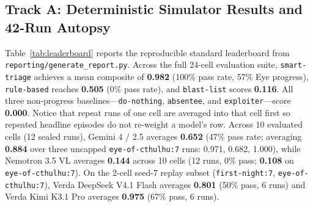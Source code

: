 \documentclass[10pt,letterpaper]{article}
\begin{document}
\subsection{Track A: Deterministic Simulator Results and 42-Run Autopsy}
Table~\ref{tab:leaderboard} reports the reproducible standard leaderboard from \texttt{reporting/generate\_report.py}. Across the full 24-cell evaluation suite, \texttt{smart-triage} achieves a mean composite of \textbf{0.982} (100\% pass rate, 57\% Eye progress), \texttt{rule-based} reaches \textbf{0.505} (0\% pass rate), and \texttt{blast-list} scores \textbf{0.116}. All three non-progress baselines---\texttt{do-nothing}, \texttt{absentee}, and \texttt{exploiter}---score \textbf{0.000}. Notice that repeat runs of one cell are averaged into that cell first so repeated headline episodes do not re-weight a model's row. Across 10 evaluated cells (12 sealed runs), Gemini 4 / 2.5 averages \textbf{0.652} (47\% pass rate; averaging \textbf{0.884} over three uncapped \texttt{eye-of-cthulhu:7} runs: 0.971, 0.682, 1.000), while Nemotron 3.5 VL averages \textbf{0.144} across 10 cells (12 runs, 0\% pass; \textbf{0.108} on \texttt{eye-of-cthulhu:7}). On the 2-cell seed-7 replay subset (\texttt{first-night:7}, \texttt{eye-of-cthulhu:7}), Verda DeepSeek V4.1 Flash averages \textbf{0.801} (50\% pass, 6 runs) and Verda Kimi K3.1 Pro averages \textbf{0.975} (67\% pass, 6 runs).
\end{document}

